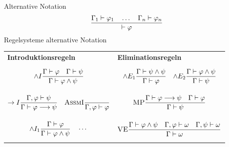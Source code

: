 \documentclass{Zusammenfassung}
\newcommand{\typeRule}[3]{ \textrm{\textsc{#1}}\frac{#2}{#3}}
\begin{document}
Alternative Notation
\begin{equation*}
    \typeRule{}{
    \Gamma_1 \vdash \varphi_1\quad\dots\quad\Gamma_n\vdash\varphi_n
    }{
    \vdash \varphi
    }
\end{equation*}
Regelsysteme alternative Notation
\begin{table}[H]
    \centering
    \begin{tabularx}{\textwidth}{XX}
        \centerline{\textbf{Introduktionsregeln}} &\centerline{\textbf{Eliminationsregeln}}\\
        \begin{equation*}\typeRule{$\wedge{}I$}{\Gamma\vdash\varphi\quad\Gamma\vdash\psi}{\Gamma\vdash\varphi\wedge\psi}\end{equation*}&\begin{equation*}\typeRule{$\wedge{}E_1$}{\Gamma\vdash\psi\wedge\psi}{\Gamma\vdash\varphi}\quad\typeRule{$\wedge{}E_2$}{\Gamma\vdash\varphi\wedge\psi}{\Gamma\vdash\psi}\end{equation*}\\
        \begin{equation*}\typeRule{$\rightarrow{}I$}{\Gamma,\varphi\vdash\psi}{\Gamma\vdash\varphi\longrightarrow\psi}\quad\typeRule{AssmI}{}{\Gamma,\varphi\vdash\varphi}\end{equation*}&\begin{equation*}\typeRule{MP}{\Gamma\vdash\varphi\longrightarrow\psi\quad\Gamma\vdash\varphi}{\Gamma\vdash\psi}\end{equation*}\\
        \begin{equation*}\typeRule{$\wedge{}I_1$}{\Gamma\vdash\varphi}{\Gamma\vdash\varphi\wedge\psi}\quad\cdots\end{equation*}&\begin{equation*}\typeRule{VE}{\Gamma\vdash\varphi\wedge\psi\quad\Gamma,\varphi\vdash\omega\quad\Gamma,\psi\vdash\omega}{\Gamma\vdash\omega}\end{equation*}\\
    \end{tabularx}\label{tab:table5}
\end{table}
\newpage
\end{document}
